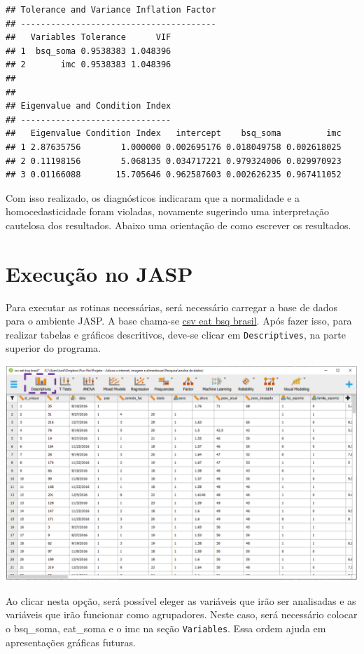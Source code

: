 \documentclass[
]{book}
\begin{document}
\begin{verbatim}
## Tolerance and Variance Inflation Factor
## ---------------------------------------
##   Variables Tolerance      VIF
## 1  bsq_soma 0.9538383 1.048396
## 2       imc 0.9538383 1.048396
## 
## 
## Eigenvalue and Condition Index
## ------------------------------
##   Eigenvalue Condition Index   intercept    bsq_soma         imc
## 1 2.87635756        1.000000 0.002695176 0.018049758 0.002618025
## 2 0.11198156        5.068135 0.034717221 0.979324006 0.029970923
## 3 0.01166088       15.705646 0.962587603 0.002626235 0.967411052
\end{verbatim}

Com isso realizado, os diagnósticos indicaram que a normalidade e a homocedasticidade foram violadas, novamente sugerindo uma interpretação cautelosa dos resultados. Abaixo uma orientação de como escrever os resultados.

\hypertarget{execuuxe7uxe3o-no-jasp-7}{%
\section{Execução no JASP}\label{execuuxe7uxe3o-no-jasp-7}}

Para executar as rotinas necessárias, será necessário carregar a base de dados para o ambiente JASP. A base chama-se \href{https://www.dropbox.com/s/l8xkxi5z5fntrd9/csv\%20eat\%20bsq\%20brasil.csv?dl=0}{csv eat bsq brasil}. Após fazer isso, para realizar tabelas e gráficos descritivos, deve-se clicar em \texttt{Descriptives}, na parte superior do programa.

\includegraphics{./img/cap_correlacao_descritivo.png}

Ao clicar nesta opção, será possível eleger as variáveis que irão ser analisadas e as variáveis que irão funcionar como agrupadores. Neste caso, será necessário colocar o bsq\_soma, eat\_soma e o imc na seção \texttt{Variables}. Essa ordem ajuda em apresentações gráficas futuras.
\end{document}
